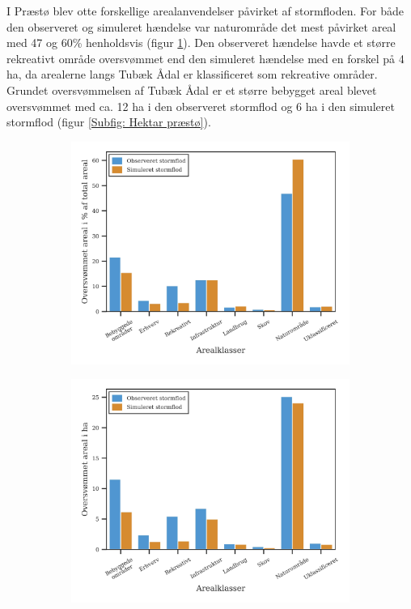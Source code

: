 I Præstø blev otte forskellige arealanvendelser påvirket af stormfloden. For både den observeret og simuleret hændelse var naturområde det mest påvirket areal med 47 og 60\% henholdsvis (figur \ref{Subfig: Procent præstø}). Den observeret hændelse havde et større rekreativt område oversvømmet end den simuleret hændelse med en forskel på 4 ha, da arealerne langs Tubæk Ådal er klassificeret som rekreative områder. Grundet oversvømmelsen af Tubæk Ådal er et større bebygget areal blevet oversvømmet med ca. 12 ha i den observeret stormflod og 6 ha i den simuleret stormflod (figur \ref{Subfig: Hektar præstø}).
\begin{figure}[H]
    \begin{subfigure}[b]{0.5\textwidth}
        \centering
        \includegraphics[width=1\linewidth]{images/Resultater/areal_anvendelses_grafer/praestoe_arealanvendelse.jpg}
        \caption{}
        \label{Subfig: Procent præstø}
    \end{subfigure}
    \begin{subfigure}[b]{0.5\textwidth}
        \centering
        \includegraphics[width=1\linewidth]{images/Resultater/areal_anvendelses_grafer/praestoe_oversvommet_Hektar.jpg}

\end{subfigure}
\end{figure}
